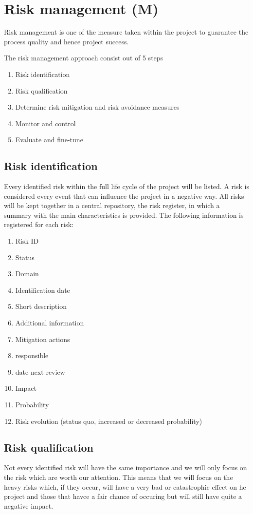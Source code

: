\section{Risk management (M)}
\label{sec:risk-management}
Risk management is one of the measure taken within the project to guarantee the process quality and hence project success.

The risk management approach consist out of 5 steps

\begin{enumerate}
	\item Risk identification 
	\item Risk qualification
	\item Determine risk mitigation and risk avoidance measures
	\item Monitor and control
	\item Evaluate and fine-tune
\end {enumerate}
\subsection{Risk identification }
Every identified risk within the full life cycle of the project will be listed. A risk is considered every event that can influence the project in a negative way. 
All risks will be kept together in a central repository, the risk register, in which a summary with the main characteristics is provided.
The following information is registered for each risk:

\begin{enumerate}
	\item Risk ID
	\item Status
	\item Domain
	\item Identification date
	\item Short description
	\item Additional information
	\item Mitigation actions
	\item responsible
	\item date next review
	\item Impact
	\item Probability
	\item Risk evolution (status quo, increased or decreased probability)
\end {enumerate}

\subsection{Risk qualification }
Not every identified risk will have the same importance and we will only focus on the risk which are worth our attention.
This means that we will focus on the heavy risks which, if they occur, will have a very bad or catastrophic effect on he project and those that havce a fair chance of occuring but will still have quite a negative impact.


